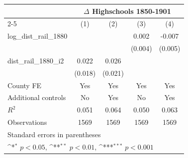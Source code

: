 {
\def\sym#1{\ifmmode^{#1}\else\(^{#1}\)\fi}
\begin{tabular}{l*{4}{c}}
\toprule
                &\multicolumn{4}{c}{$\Delta$ Highschools 1850-1901}                         \\\cmidrule(lr){2-5}
                &\multicolumn{1}{c}{(1)}         &\multicolumn{1}{c}{(2)}         &\multicolumn{1}{c}{(3)}         &\multicolumn{1}{c}{(4)}         \\
\midrule
log\_dist\_rail\_1880&                  &                  &    0.002         &   -0.007         \\
                &                  &                  &  (0.004)         &  (0.005)         \\
dist\_rail\_1880\_i2&    0.022         &    0.026         &                  &                  \\
                &  (0.018)         &  (0.021)         &                  &                  \\
County FE       &      Yes         &      Yes         &      Yes         &      Yes         \\
Additional controls &       No         &      Yes         &       No         &      Yes         \\
\midrule
\(R^{2}\)       &    0.051         &    0.064         &    0.050         &    0.063         \\
Observations    &     1569         &     1569         &     1569         &     1569         \\
\bottomrule
\multicolumn{5}{l}{\footnotesize Standard errors in parentheses}\\
\multicolumn{5}{l}{\footnotesize \sym{*} \(p<0.05\), \sym{**} \(p<0.01\), \sym{***} \(p<0.001\)}\\
\end{tabular}
}
